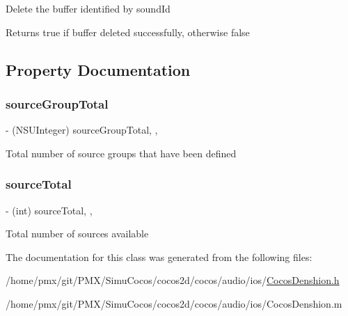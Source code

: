 Delete the buffer identified by sound\+Id \begin{DoxyReturn}{Returns}
true if buffer deleted successfully, otherwise false 
\end{DoxyReturn}


\subsection{Property Documentation}
\mbox{\label{interfaceCDSoundEngine_a2e416630cc0722eac6ba889dcb9461ba}} 
\subsubsection{\texorpdfstring{source\+Group\+Total}{sourceGroupTotal}}
{\footnotesize\ttfamily -\/ (N\+S\+U\+Integer) source\+Group\+Total\hspace{0.3cm}{\ttfamily [read]}, {\ttfamily [atomic]}, {\ttfamily [assign]}}

Total number of source groups that have been defined \mbox{\label{interfaceCDSoundEngine_a951c8a98f46192e4ed56ebe41f7abe59}} 
\subsubsection{\texorpdfstring{source\+Total}{sourceTotal}}
{\footnotesize\ttfamily -\/ (int) source\+Total\hspace{0.3cm}{\ttfamily [read]}, {\ttfamily [atomic]}, {\ttfamily [assign]}}

Total number of sources available 

The documentation for this class was generated from the following files\+:\begin{DoxyCompactItemize}
\item 
/home/pmx/git/\+P\+M\+X/\+Simu\+Cocos/cocos2d/cocos/audio/ios/\hyperlink{cocos2d_2cocos_2audio_2ios_2CocosDenshion_8h}{Cocos\+Denshion.\+h}\item 
/home/pmx/git/\+P\+M\+X/\+Simu\+Cocos/cocos2d/cocos/audio/ios/Cocos\+Denshion.\+m\end{DoxyCompactItemize}
